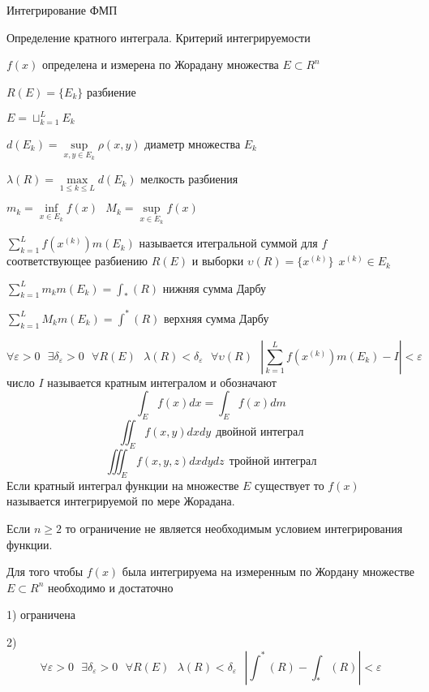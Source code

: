 \begin{title}
  Интегрирование ФМП
\end{title}

\begin{title}[\Large]
  Определение кратного интеграла. Критерий интегрируемости
\end{title}

\begin{block}[Обозначения]
  $f(x)$ определена и измерена по Жорадану множества $E \subset R^n$

  $R(E) = \{E_k\}$ разбиение

  $E = \sqcup_{k=1}^L E_k$

  $d(E_k) = \sup \limits_{x,y \in E_k} \rho(x,y)$ диаметр множества $E_k$

  $\lambda(R) = \max \limits_{1 \le k \le L} d(E_k)$ мелкость разбиения

  $m_k = \inf \limits_{x \in E_k} f(x) ~~~ M_k = \sup \limits_{x \in E_k} f(x)$

  $\sum_{k=1}^L f(x^{(k)}) m(E_k)$ называется итегральной суммой для $f$
  соответствующее разбиению $R(E)$ и выборки $\upsilon(R) = \{x^{(k)}\} ~~
  x^{(k)} \in E_k$

  $\sum_{k=1}^L m_k m(E_k) = \int_* (R)$ нижняя сумма Дарбу

  $\sum_{k=1}^L M_k m(E_k) = \int^* (R)$ верхняя сумма Дарбу
\end{block}

\begin{define}
  $$
  \forall \varepsilon > 0 ~~~ \exists \delta_{\varepsilon} > 0 ~~~
  \forall R(E) ~~~ \lambda(R) < \delta_{\varepsilon} ~~~
  \forall \upsilon(R) ~~~ \left| \sum_{k=1}^L f(x^{(k)}) m(E_k) - I \right|
  < \varepsilon
  $$
  число $I$ называется кратным интегралом и обозначают
  $$
  \int_E f(x) dx = \int_E f(x) dm
  $$
  $$
  \iint_E f(x,y) dxdy ~~ \text{двойной интеграл}
  $$
  $$
  \iiint_E f(x,y,z) dxdydz ~~ \text{тройной интеграл}
  $$
  Если кратный интеграл функции на множестве $E$ существует то $f(x)$
  называется интегрируемой по мере Жорадана.

  Если $n \ge 2$ то ограничение не является необходимым условием
  интегрирования функции.
\end{define}

\begin{block}
  Для того чтобы $f(x)$ была интегрируема на измеренным по Жордану множестве
  $E \subset R^n$ необходимо и достаточно

  1) ограничена

  2)
  $$
  \forall \varepsilon > 0 ~~~ \exists \delta_{\varepsilon} > 0 ~~~ \forall R(E)
  ~~~ \lambda(R) < \delta_{\varepsilon} ~~~ \left| \int^*(R) - \int_*(R)
  \right| < \varepsilon
  $$
\end{block}

